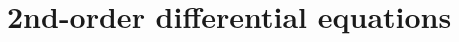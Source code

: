 \documentclass[a4paper]{book} %
\begin{document}
\chapter{2nd-order differential equations}

%
%
%
%
%
%
%

\end{document}
